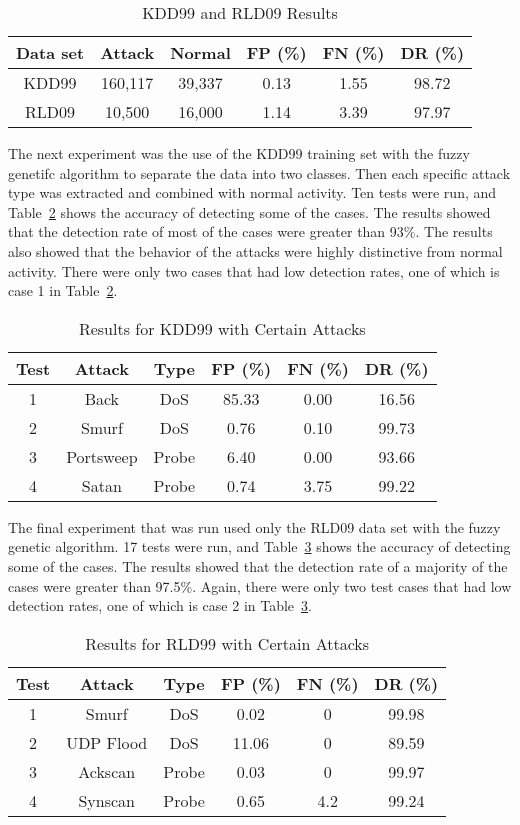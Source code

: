 \documentclass{sig-alternate}
\begin{document}
\begin{table}
\caption{KDD99 and RLD09 Results}
\begin{tabular}{cccccc}
Data set & Attack & Normal & FP (\%) & FN (\%) & DR (\%)\\ \hline
KDD99 & 160,117 & 39,337 & 0.13 & 1.55 & 98.72\\
RLD09 & 10,500 & 16,000 & 1.14 & 3.39 & 97.97\\
\end{tabular}
\label{tab:bothSetsResults}
\end{table}

The next experiment was the use of the KDD99 training set with the fuzzy genetifc algorithm to separate the data into two classes. Then each specific attack type was extracted and combined with normal activity. Ten tests were run, and Table~\ref{tab:kddAttacks} shows the accuracy of detecting some of the cases. The results showed that the detection rate of most of the cases were greater than 93\%. The results also showed that the behavior of the attacks were highly distinctive from normal activity. There were only two cases that had low detection rates, one of which is case 1 in Table~\ref{tab:kddAttacks}.

\begin{table}
\caption{Results for KDD99 with Certain Attacks}
\begin{tabular}{cccccc}
Test & Attack & Type & FP (\%) & FN (\%) & DR (\%)\\ \hline
1 & Back & DoS & 85.33 & 0.00 & 16.56\\
2 & Smurf & DoS & 0.76 & 0.10 & 99.73\\
3 & Portsweep & Probe & 6.40 & 0.00 & 93.66\\
4 & Satan & Probe & 0.74 & 3.75 & 99.22\\
\end{tabular}
\label{tab:kddAttacks}
\end{table}

The final experiment that was run used only the RLD09 data set with the fuzzy genetic algorithm. 17 tests were run, and Table~\ref{tab:rldAttacks} shows the accuracy of detecting some of the cases. The results showed that the detection rate of a majority of the cases were greater than 97.5\%. Again, there were only two test cases that had low detection rates, one of which is case 2 in Table~\ref{tab:rldAttacks}.

\begin{table}
\caption{Results for RLD99 with Certain Attacks}
\begin{tabular}{cccccc}
Test & Attack & Type & FP (\%) & FN (\%) & DR (\%)\\ \hline
1 & Smurf & DoS & 0.02 & 0 & 99.98\\
2 & UDP Flood & DoS & 11.06 & 0 & 89.59\\
3 & Ackscan & Probe & 0.03 & 0 & 99.97\\
4 & Synscan & Probe & 0.65 & 4.2 & 99.24\\
\end{tabular}
\label{tab:rldAttacks}
\end{table}
\end{document}
